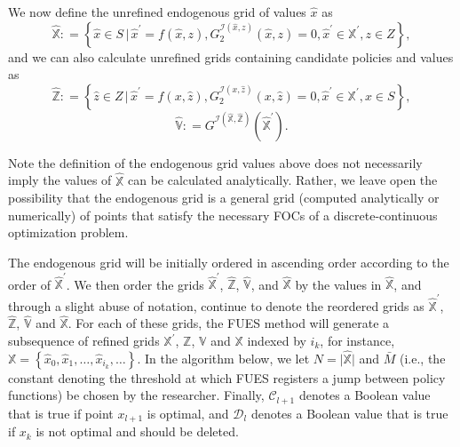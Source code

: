 \documentclass[12pt]{article}
\begin{document}
We now define the unrefined endogenous grid of values $\hat{x}$ as
%
\begin{equation}
\hat{\mathbb{X}}\colon =  \left\{\hat{x}\in S\,\big\vert\, \hat{x}^{\prime} = f(\hat{x},z),  G^{\mathcal{I}(\hat{x},z)}_{2}(\hat{x},z) = 0, \hat{x}^{\prime}\in \mathbb{X}^{\prime}, z\in Z\right\},
\end{equation}
%
and we can also calculate unrefined grids containing candidate policies and values as
%
\begin{equation}
\hat{\mathbb{Z}}\colon =  \left\{\hat{z}\in Z\,\big\vert\, \hat{x}^{\prime} = f(x,\hat{z}),  G^{\mathcal{I}(x,\hat{z})}_{2}(x,\hat{z}) = 0, \hat{x}^{\prime}\in \mathbb{X}^{\prime}, x\in S\right\},
\end{equation}
%
\begin{equation}
\hat{\mathbb{V}}\colon =G^{\mathcal{I}(\hat{\mathbb{X}},\hat{\mathbb{Z}} )}(\hat{\mathbb{X}}^{\prime}).
\end{equation}

Note the definition of the endogenous grid values above does not necessarily imply the values of $\hat{\mathbb{X}}$ can be calculated analytically. Rather, we leave open the possibility that the endogenous grid is a general grid (computed analytically or numerically) of points that satisfy the necessary FOCs of a discrete-continuous optimization problem.

The endogenous grid will be initially ordered in ascending order according to the order of $\hat{\mathbb{X}}^{\prime}$. We then order the grids $\hat{\mathbb{X}}^{\prime}$, $\hat{\mathbb{Z}}$, $\hat{\mathbb{V}}$, and $\hat{\mathbb{X}}$ by the values in $\hat{\mathbb{X}}$, and through a slight abuse of notation, continue to denote the reordered grids as $\hat{\mathbb{X}}^{\prime}$, $\hat{\mathbb{Z}}$, $\hat{\mathbb{V}}$ and $\hat{\mathbb{X}}$. For each of these grids, the FUES method will generate a subsequence of refined grids $\mathbb{X}^{\prime}$, $\mathbb{Z}$, $\mathbb{V}$ and $\mathbb{X}$ indexed by $i_{k}$, for instance, $\mathbb{X} = \left\{\hat{x}_{0},\hat{x}_{1}, \dots, \hat{x}_{i_{k}}, \dots\right\}$. In the algorithm below, we let $N = \vert \hat{\mathbb{X}}\vert$ and $\bar{M}$ (i.e., the constant denoting the threshold at which FUES registers a jump between policy functions) be chosen by the researcher. Finally, $\mathcal{C}_{l+1}$ denotes a Boolean value that is true if point $x_{l+1}$ is optimal, and $\mathcal{D}_{l}$ denotes a Boolean value that is true if  $x_{k}$ is not optimal and should be deleted.
\end{document}
